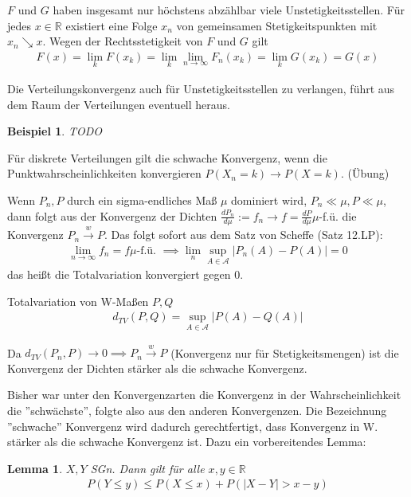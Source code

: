 \documentclass[]{article}
\newtheorem{lemma}{Lemma}
\newtheorem*{example}{Beispiel}
\begin{document}
$F$ und $G$ haben insgesamt nur höchstens abzählbar viele Unstetigkeitsstellen. Für jedes $x\in \mathbb{R}$ existiert eine Folge $x_n$ von gemeinsamen Stetigkeitspunkten mit $x_n \searrow x$. Wegen der Rechtsstetigkeit von $F$ und $G$ gilt
\begin{align*}
	F(x) = \lim_k F(x_k) = \lim_k \lim\limits_{n\rightarrow\infty} F_n(x_k) = \lim_k G(x_k) = G(x)
\end{align*}

Die Verteilungskonvergenz auch für Unstetigkeitsstellen zu verlangen, führt aus dem Raum der Verteilungen eventuell heraus.

\begin{example}
	TODO
\end{example}

Für diskrete Verteilungen gilt die schwache Konvergenz, wenn die Punktwahrscheinlichkeiten konvergieren $P(X_n = k) \rightarrow P(X=k)$. (Übung)

Wenn $P_n, P$ durch ein sigma-endliches Maß $\mu$ dominiert wird, $P_n \ll \mu, P \ll \mu$, dann folgt aus der Konvergenz der Dichten $\frac{dP_n}{d\mu} := f_n \rightarrow f = \frac{dP}{d\mu} \mu$-f.ü. die Konvergenz $P_n\xrightarrow{w} P$. Das folgt sofort aus dem Satz von Scheffe (Satz 12.LP):
\begin{align*}
	\lim\limits_{n\rightarrow\infty}f_n = f \mu\text{-f.ü. } \implies \lim_n \sup_{A\in \mathcal{A}} |P_n(A) - P(A)| = 0
\end{align*}
das heißt die Totalvariation konvergiert gegen $0$.

Totalvariation von W-Maßen $P,Q$
\begin{align*}
	d_{TV}(P,Q) = \sup_{A\in \mathcal{A}} |P(A) - Q(A)|
\end{align*}

Da $d_{TV}(P_n,P)\rightarrow 0 \implies P_n\xrightarrow{w} P$ (Konvergenz nur für Stetigkeitsmengen) ist die Konvergenz der Dichten stärker als die schwache Konvergenz.

Bisher war unter den Konvergenzarten die Konvergenz in der Wahrscheinlichkeit die ''schwächste'', folgte also aus den anderen Konvergenzen. Die Bezeichnung ''schwache'' Konvergenz wird dadurch gerechtfertigt, dass Konvergenz in W. stärker als die schwache Konvergenz ist. Dazu ein vorbereitendes Lemma:

\begin{lemma}
	$X,Y$ SGn. Dann gilt für alle $x,y\in\mathbb{R}$
	\begin{align*}
		P(Y\leq y) \leq P(X \leq x) + P(|X-Y| > x-y)
	\end{align*}
\end{lemma}
\end{document}
